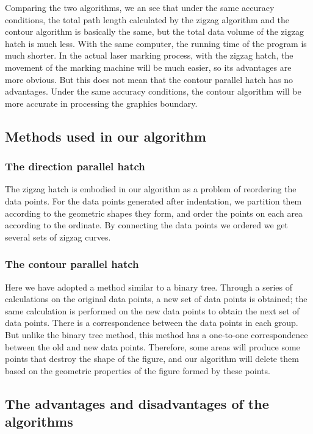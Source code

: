 \documentclass{apmcmthesis}
\begin{document}
Comparing the two algorithms, we an see that under the same accuracy conditions, the total path length calculated by the zigzag algorithm and the contour algorithm is basically the same, but the total data volume of the zigzag hatch is much less. With the same computer, the running time of the program is much shorter. In the actual laser marking process, with the zigzag hatch, the movement of the marking machine will be much easier, so its advantages are more obvious. But this does not mean that the contour parallel hatch has no advantages. Under the same accuracy conditions, the contour algorithm will be more accurate in processing the graphics boundary.


\subsection{Methods used in our algorithm}

\subsubsection{The direction parallel hatch}

The zigzag hatch is embodied in our algorithm as a problem of reordering the data points. For the data points generated after indentation, we partition them according to the geometric shapes they form, and order the points on each area according to the ordinate. By connecting the data points we ordered we get several sets of zigzag curves.

\subsubsection{The contour parallel hatch}

Here we have adopted a method similar to a binary tree. Through a series of calculations on the original data points, a new set of data points is obtained; the same calculation is performed on the new data points to obtain the next set of data points. There is a correspondence between the data points in each group. But unlike the binary tree method, this method has a one-to-one correspondence between the old and new data points. Therefore, some areas will produce some points that destroy the shape of the figure, and our algorithm will delete them based on the geometric properties of the figure formed by these points.

\subsection{The advantages and disadvantages of the algorithms}
\end{document}
